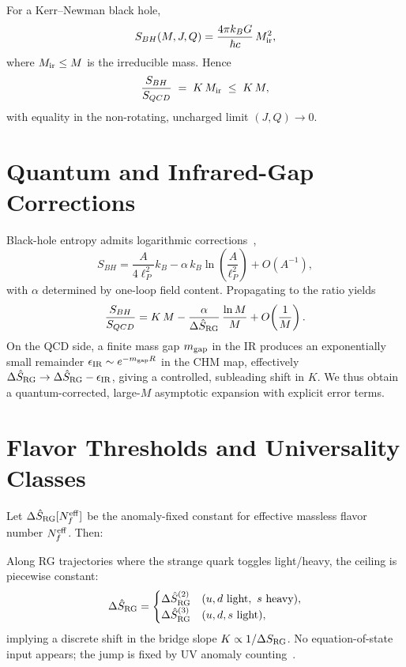 \documentclass[aps,prd,onecolumn,nofootinbib,superscriptaddress]{revtex4-2}
\begin{document}
\begin{proposition}
For a Kerr--Newman black hole,
\begin{equation}
S_{BH}(M,J,Q)=\frac{4\pi k_B G}{\hbar c}\,M_{\rm ir}^2,
\end{equation}
where $M_{\rm ir}\le M$ is the irreducible mass. Hence
\begin{equation}
\frac{S_{BH}}{S_{QCD}} \;=\; K\,M_{\rm ir} \;\le\; K\,M,
\end{equation}
with equality in the non-rotating, uncharged limit $(J,Q)\to 0$.
\end{proposition}

\section{Quantum and Infrared-Gap Corrections}

Black-hole entropy admits logarithmic corrections~\cite{kaul2000},
\begin{equation}
S_{BH}=\frac{A}{4\ell_P^2}k_B - \alpha\,k_B\ln\!\left(\frac{A}{\ell_P^2}\right) + O(A^{-1}),
\end{equation}
with $\alpha$ determined by one-loop field content. Propagating to the ratio yields
\begin{equation}
\frac{S_{BH}}{S_{QCD}}
= K\,M - \frac{\alpha}{\Delta\hat S_{\rm RG}}\,\frac{\ln M}{M}
+ O\!\left(\frac{1}{M}\right).
\end{equation}
On the QCD side, a finite mass gap $m_{\rm gap}$ in the IR produces an exponentially small remainder 
$\epsilon_{\rm IR}\sim e^{-m_{\rm gap}R}$ in the CHM map, effectively 
$\Delta\hat S_{\rm RG}\to \Delta\hat S_{\rm RG}-\epsilon_{\rm IR}$, giving a controlled, subleading shift in $K$.
We thus obtain a quantum-corrected, large-$M$ asymptotic expansion with explicit error terms.

\section{Flavor Thresholds and Universality Classes}

Let $\Delta\hat S_{\rm RG}[N_f^{\rm eff}]$ be the anomaly-fixed constant for effective massless flavor number $N_f^{\rm eff}$. Then:
\begin{theorem}
Along RG trajectories where the strange quark toggles light/heavy, the ceiling is piecewise constant:
\begin{equation}
\Delta\hat S_{\rm RG}=
\begin{cases}
\Delta\hat S_{\rm RG}^{(2)} & (u,d\ \text{light},\ s\ \text{heavy}),\\
\Delta\hat S_{\rm RG}^{(3)} & (u,d,s\ \text{light}),
\end{cases}
\end{equation}
implying a discrete shift in the bridge slope $K\propto 1/\Delta S_{\rm RG}$. No equation-of-state input appears; the jump is fixed by UV anomaly counting~\cite{thooft1980}.
\end{theorem}
\end{document}
